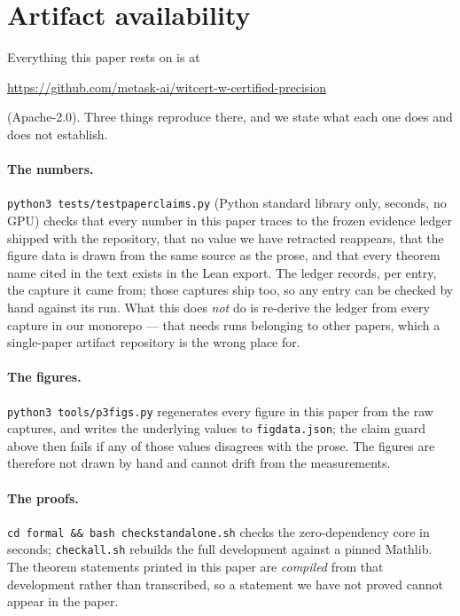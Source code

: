 \documentclass[11pt]{article}
\renewcommand{\_}{\WCorigunderscore\allowbreak}
\begin{document}
\section{Artifact availability}
\label{sec:artifact}
Everything this paper rests on is at
\begin{center}
\url{https://github.com/metask-ai/witcert-w-certified-precision}
\end{center}
\noindent(Apache-2.0). Three things reproduce there, and we state what each one
does and does not establish.

\paragraph{The numbers.} \texttt{python3 tests/test\_paper\_claims.py}
(Python standard library only, seconds, no GPU) checks that every number
in this paper traces to the frozen evidence ledger shipped with the
repository, that no value we have retracted reappears, that the figure
data is drawn from the same source as the prose, and that every theorem
name cited in the text exists in the Lean export. The ledger records,
per entry, the capture it came from; those captures ship too, so any
entry can be checked by hand against its run. What this does \emph{not}
do is re-derive the ledger from every capture in our monorepo --- that
needs runs belonging to other papers, which a single-paper artifact
repository is the wrong place for.

\paragraph{The figures.} \texttt{python3 tools/p3\_figs.py} regenerates
every figure in this paper from the raw captures, and writes the
underlying values to \texttt{figdata.json}; the claim guard above then
fails if any of those values disagrees with the prose. The figures are
therefore not drawn by hand and cannot drift from the measurements.

\paragraph{The proofs.} \texttt{cd formal \&\& bash
check\_standalone.sh} checks the zero-dependency core in seconds;
\texttt{check\_all.sh} rebuilds the full development against a pinned
Mathlib. The theorem statements printed in this paper are
\emph{compiled} from that development rather than transcribed, so a
statement we have not proved cannot appear in the paper.
\end{document}
